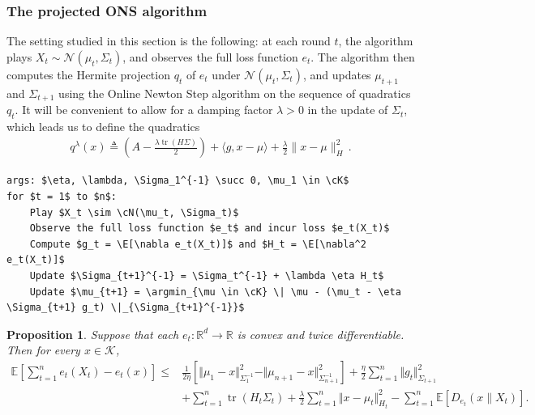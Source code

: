 \documentclass{article}
\theoremstyle{plain}
\newtheorem{proposition}[theorem]{Proposition}
\theoremstyle{definition}
\theoremstyle{plain}
\newcommand{\R}{\mathbb R}
\newcommand{\tr}{\operatorname{tr}}
\newcommand{\argmin}{\operatornamewithlimits{arg\,min}}
\newcommand{\norm}[1]{\Vert #1 \Vert}
\newcommand{\E}{\mathbb E}
\newcommand{\cN}{\mathcal N}
\newcommand{\cK}{\mathcal K}
\begin{document}
\subsubsection{The projected ONS algorithm}
The setting studied in this section is the following: at each round $t$, the algorithm plays $X_t \sim \cN(\mu_t, \Sigma_t)$, and observes the full loss function $e_t$.
The algorithm then computes the Hermite projection $q_t$ of $e_t$ under $\cN(\mu_t, \Sigma_t)$, and updates $\mu_{t+1}$ and $\Sigma_{t+1}$ using the Online Newton Step algorithm on the sequence of quadratics $q_t$.
It will be convenient to allow for a damping factor $\lambda > 0$ in the update of $\Sigma_t$, which leads us to define the quadratics
\begin{align}
    q^\lambda(x) \triangleq \left(A - \frac{\lambda \tr(H\Sigma)}{2}\right) + \langle g, x-\mu\rangle + \frac{\lambda}{2}\|x-\mu\|^2_{H}\,.
\end{align}
\begin{algorithm}[h!]
    \begin{minipage}{13cm}
        \begin{mdframed}
            \begin{lstlisting}
args: $\eta, \lambda, \Sigma_1^{-1} \succ 0, \mu_1 \in \cK$
for $t = 1$ to $n$:
    Play $X_t \sim \cN(\mu_t, \Sigma_t)$
    Observe the full loss function $e_t$ and incur loss $e_t(X_t)$
    Compute $g_t = \E[\nabla e_t(X_t)]$ and $H_t = \E[\nabla^2 e_t(X_t)]$
    Update $\Sigma_{t+1}^{-1} = \Sigma_t^{-1} + \lambda \eta H_t$
    Update $\mu_{t+1} = \argmin_{\mu \in \cK} \| \mu - (\mu_t - \eta \Sigma_{t+1} g_t) \|_{\Sigma_{t+1}^{-1}}$
\end{lstlisting}
            \caption{Hermite-ONS algorithm.}\label{alg:HermiteOnlineNewtonStep}
        \end{mdframed}
    \end{minipage}
\end{algorithm}

\begin{proposition}
    \label{prop:hermite-ons:master}
    Suppose that each $e_t:\R^d\to\R$ is convex and twice differentiable.
    Then for every $x\in\cK$,
    \begin{align}
        \E\left[
            \sum_{t=1}^{n}
            e_t(X_t) - e_t(x)
            \right]
        \leq
         & \frac{1}{2\eta}
        \left[
        \norm{\mu_1-x}_{\Sigma_1^{-1}}^2
        -
        \norm{\mu_{n+1}-x}_{\Sigma_{n+1}^{-1}}^2
        \right]
        +\frac{\eta}{2}\sum_{t=1}^n\norm{g_t}_{\Sigma_{t+1}}^2
        \\
         &
        +\sum_{t=1}^n\tr(H_t\Sigma_t)
        +\frac{\lambda}{2}\sum_{t=1}^n\norm{x-\mu_t}_{H_t}^2
        - \sum_{t=1}^n \E[D_{e_t}(x\|X_t)].
        \label{eq:hermite-ons:master}
    \end{align}
\end{proposition}
\end{document}
